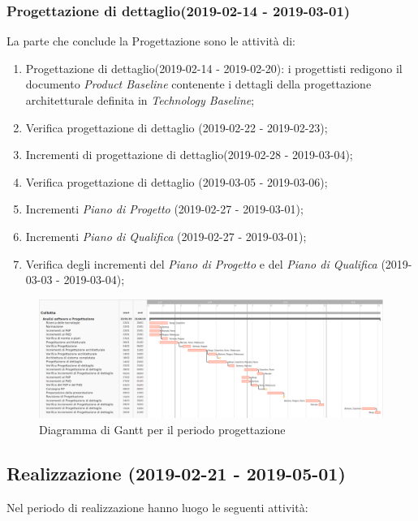 		\subsubsection{Progettazione di dettaglio(2019-02-14 - 2019-03-01)\\} La parte che conclude la Progettazione sono le attività di:
			\begin{enumerate}[label = 3.3.\arabic*)]
				\item Progettazione di dettaglio(2019-02-14 - 2019-02-20): i progettisti redigono il documento \textit{Product Baseline} contenente i dettagli della progettazione architetturale definita in \textit{Technology Baseline};
				\item Verifica progettazione di dettaglio (2019-02-22 - 2019-02-23);
				\item Incrementi di progettazione di dettaglio(2019-02-28 - 2019-03-04);
				\item Verifica progettazione di dettaglio (2019-03-05 - 2019-03-06);
				\item Incrementi \textit{Piano di Progetto} (2019-02-27 - 2019-03-01);
				\item Incrementi \textit{Piano di Qualifica} (2019-02-27 - 2019-03-01);	
				\item Verifica degli incrementi del \textit{Piano di Progetto} e del \textit{Piano di Qualifica} (2019-03-03 - 2019-03-04);
			\end{enumerate}
	
	\begin{figure}[!hbtp]
		\centering
		\includegraphics[scale=0.5,angle=90]{images/ganttprog.png}
		\caption{Diagramma di Gantt per il periodo progettazione}
	\end{figure}
	
	\newpage	
	\subsection{Realizzazione (2019-02-21 - 2019-05-01)}
		Nel periodo di realizzazione hanno luogo le seguenti attività:
